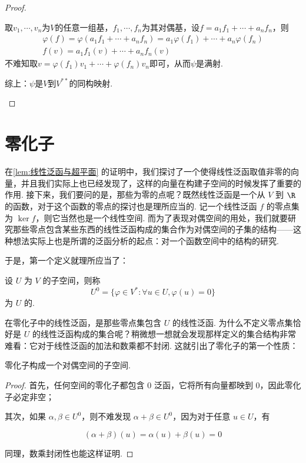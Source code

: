 \begin{proof}
\begin{enumerate}
\begin{enumerate}
            取$v_1,\cdots,v_n$为$V$的任意一组基，$f_1,\cdots,f_n$为其对偶基，设$f=a_1f_1+\cdots+a_nf_n$，则
            \begin{gather*}
                \varphi(f) = \varphi(a_1f_1+\cdots+a_nf_n)
                           = a_1\varphi(f_1)+\cdots+a_n\varphi(f_n) \\
                f(v) = a_1f_1(v)+\cdots+a_nf_n(v)
            \end{gather*}
            不难知取$v=\varphi(f_1)v_1+\cdots+\varphi(f_n)v_n$即可，从而$\psi$是满射.
        \end{enumerate}
        综上：$\psi$是$V$到$V^{**}$的同构映射.
    \end{enumerate}
\end{proof}

\section{零化子}

在\autoref{lem:线性泛函与超平面} 的证明中，我们探讨了一个使得线性泛函取值非零的向量，并且我们实际上也已经发现了，这样的向量在构建子空间的时候发挥了重要的作用. 接下来，我们要问的是，那些为零的点呢？既然线性泛函是一个从 $V$ 到 $\R$ 的函数，对于这个函数的零点的探讨也是理所应当的. 记一个线性泛函 $f$ 的零点集为 $\ker f$，则它当然也是一个线性空间. 而为了表现对偶空间的用处，我们就要研究那些零点包含某些东西的线性泛函构成的集合作为对偶空间的子集的结构——这种想法实际上也是所谓的泛函分析的起点：对一个函数空间中的结构的研究.

于是，第一个定义就理所应当了：

\begin{definition}{}{}
    设 $U$ 为 $V$ 的子空间，则称
    \[
        U^0 = \{\varphi \in V^*: \forall u \in U, \varphi(u) = 0\}
    \]
    为 $U$ 的.
\end{definition}

在零化子中的线性泛函，是那些零点集包含 $U$ 的线性泛函. 为什么不定义零点集恰好是 $U$ 的线性泛函构成的集合呢？稍微想一想就会发现那样定义的集合结构非常难看：它对于线性泛函的加法和数乘都不封闭. 这就引出了零化子的第一个性质：

\begin{theorem}{}{}
    零化子构成一个对偶空间的子空间.
\end{theorem}

\begin{proof}
    首先，任何空间的零化子都包含 $0$ 泛函，它将所有向量都映到 $0$，因此零化子必定非空；

    其次，如果 $\alpha, \beta \in U^0$，则不难发现 $\alpha + \beta \in U^0$，因为对于任意 $u \in U$，有

    \[
        (\alpha + \beta) (u) = \alpha (u) + \beta (u) = 0
    \]

    同理，数乘封闭性也能这样证明.
\end{proof}

